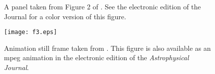 \documentclass[manuscript]{../aastex52/aastex}
\begin{document}
\clearpage



\clearpage


\begin{figure}
\caption{A panel taken from Figure 2 of \citet{rudnick03}. 
See the electronic edition of the Journal for a color version 
of this figure.\label{fig2}}
\end{figure}


\begin{figure}
\texttt{[image: f3.eps]}
\caption{Animation still frame taken from \citet{kim03}.
This figure is also available as an mpeg
animation in the electronic edition of the
{\it Astrophysical Journal}.}
\end{figure}

\end{document}
